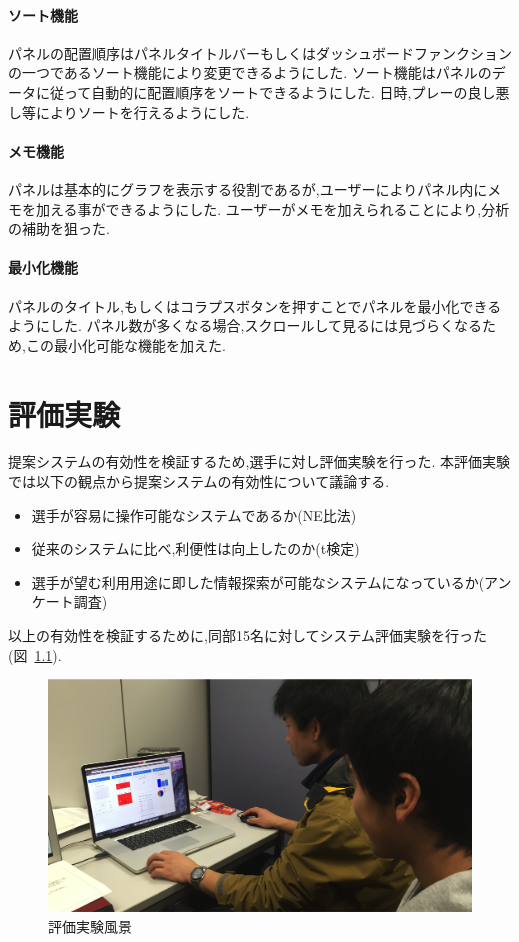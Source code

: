 \documentclass[sotsuron]{kuee}
\begin{document}
			\subsubsection{ソート機能}
			パネルの配置順序はパネルタイトルバーもしくはダッシュボードファンクションの一つであるソート機能により変更できるようにした. 
			ソート機能はパネルのデータに従って自動的に配置順序をソートできるようにした. 
			日時,プレーの良し悪し等によりソートを行えるようにした. 
			\subsubsection{メモ機能}
			パネルは基本的にグラフを表示する役割であるが,ユーザーによりパネル内にメモを加える事ができるようにした. 
			ユーザーがメモを加えられることにより,分析の補助を狙った. 
			\subsubsection{最小化機能}
			パネルのタイトル,もしくはコラプスボタンを押すことでパネルを最小化できるようにした. 
			パネル数が多くなる場合,スクロールして見るには見づらくなるため,この最小化可能な機能を加えた. 

\chapter{評価実験}
	提案システムの有効性を検証するため,選手に対し評価実験を行った. 
	本評価実験では以下の観点から提案システムの有効性について議論する. 
	\begin{itemize}
		\item 選手が容易に操作可能なシステムであるか(NE比法)
		\item 従来のシステムに比べ,利便性は向上したのか(t検定)
		\item 選手が望む利用用途に即した情報探索が可能なシステムになっているか(アンケート調査)
	\end{itemize}
	以上の有効性を検証するために,同部15名に対してシステム評価実験を行った(図~\ref{fig:experi}). 
		\begin{figure}
			\begin{center}
				\includegraphics[width=\linewidth]{./png/experience.png}
			\end{center}
			\caption{評価実験風景}
	  		\label{fig:experi}
		\end{figure}
\end{document}
